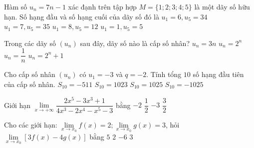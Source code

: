 \begin{ex}%
	Hàm số $u_n=7n-1$ xác đạnh trên tập hợp $M=\{1; 2; 3; 4; 5\}$ là một dãy số hữu hạn. Số hạng đầu và số hạng cuối của dãy số đó là
	\choice
	{\True $u_1=6, u_5=34$}
	{$u_1=7, u_5=35$}
	{$u_1=8, u_5=12$}
	{$u_1=1, u_5=5$}
\end{ex}
\begin{ex}%
	Trong các dãy số $\left(u_n\right)$ sau đây, dãy số nào là cấp số nhân?
	\choice
	{$u_n=3n$}
	{\True $u_n=2^n$}
	{$u_n=\dfrac{1}{n}$}
	{$u_n=2^n+1$}
\end{ex}
\begin{ex}%
	Cho cấp số nhân $\left(u_n\right)$ có $u_1=-3$ và $q=-2$. Tính tổng $10$ số hạng đầu tiên của cấp số nhân.
	\choice
	{$S_{10}=-511$}
	{$S_{10}=1023$}
	{$S_{10}=1025$}
	{$S_{10}=-1025$}
\end{ex}
\begin{ex}%
	Giới hạn $\lim\limits_{x\to +\infty} \dfrac{2x^5-3x^3+1}{4x^3-2x^4-x^5-3}$ bằng
	\choice
	{\True $-2$}
	{$\dfrac{1}{2}$}
	{$-3$}
	{$\dfrac{3}{2}$}
\end{ex}
\begin{ex}%
	Cho các giới hạn: $\lim\limits_{x\to  x_0} f(x)=2; \lim\limits_{x\to  x_0} g(x)=3$, hỏi $\lim\limits_{x\to  x_0}[3 f(x)-4 g(x)]$ bằng
	\choice
	{$5$}
	{$2$}
	{\True $-6$}
	{$3$}
\end{ex}
\cauds
